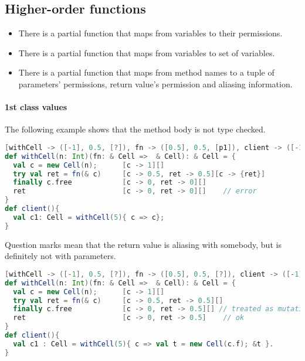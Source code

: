 \clearpage
\subsection{Higher-order functions}
\begin{itemize}
\item There is a partial function  that maps from variables to their permissions.
\item There is a partial function  that maps from variables to set of variables. 
\item There is a partial function  that maps from method names to a tuple of parameters' permissions,  return value's permission and aliasing information.
\end{itemize}

\paragraph{1st class values}

The following example shows that the method body is not type checked. 
\begin{lstlisting}[language=Scala,basicstyle=\footnotesize\ttfamily]
[withCell -> ([-1], 0.5, [?]), fn -> ([0.5], 0.5, [p1]), client -> ([-1], -1, [])]
def withCell(n: Int)(fn: & Cell =>  & Cell): & Cell = {
  val c = new Cell(n);      [c -> 1][]
  try val ret = fn(& c)     [c -> 0.5, ret -> 0.5][c -> {ret}]  
  finally c.free            [c -> 0, ret -> 0][]
  ret                       [c -> 0, ret -> 0][]    // error
}
def client(){
  val c1: Cell = withCell(5){ c => c};
}
\end{lstlisting}

Question marks mean that the return value is aliasing with somebody, but is definitely not with parameters.
\begin{lstlisting}[language=Scala,basicstyle=\footnotesize\ttfamily]
[withCell -> ([-1], 0.5, [?]), fn -> ([0.5], 0.5, [?]), client -> ([-1], -1, [])]
def withCell(n: Int)(fn: & Cell =>  & Cell): & Cell = {
  val c = new Cell(n);      [c -> 1][]
  try val ret = fn(& c)     [c -> 0.5, ret -> 0.5][]  
  finally c.free            [c -> 0, ret -> 0.5][] // treated as mutation
  ret                       [c -> 0, ret -> 0.5]    // ok
}
def client(){
  val c1 : Cell = withCell(5){ c => val t = new Cell(c.f); &t }.
}
\end{lstlisting}

